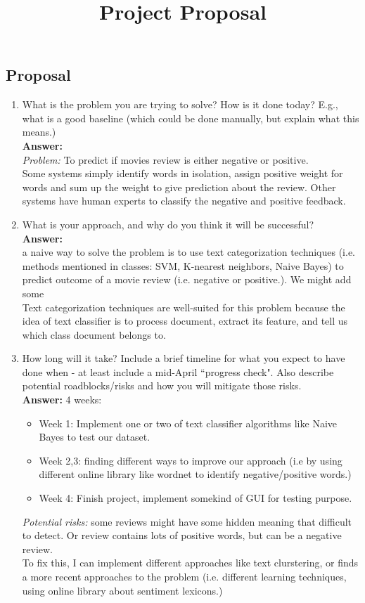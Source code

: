\documentclass[]{article}
\title{Project Proposal}
\begin{document}
\maketitle


\subsection{Proposal}\label{Potential risks:}
\begin{enumerate}
\item 
What is the problem you are trying to solve?
How is it done today? E.g., what is a good baseline (which could be done manually, but explain what this means.)\\
\textbf{Answer:}\\ \textit{Problem:} To predict if movies review is either negative or positive.\\
Some systems simply identify words in isolation, assign positive weight for words and sum up the weight to give prediction about the review. Other systems have human experts to classify the negative and positive feedback. 
\item What is your approach, and why do you think it will be successful?\\
\textbf{Answer:}\\ a naive way to solve the problem is to use text categorization techniques (i.e. methods mentioned in classes: SVM, K-nearest neighbors, Naive Bayes) to predict outcome of a movie review (i.e. negative or positive.). We might add some \\
Text categorization techniques are well-suited for this problem because the idea of text classifier is to process document, extract its feature, and tell us which class document belongs to.
\item How long will it take? Include a brief timeline for what you expect to have done when - at least include a mid-April ``progress check". Also describe potential roadblocks/risks and how you will mitigate those risks.
\\\textbf{Answer:}
4 weeks:
\begin{itemize}
   \item Week 1: Implement one or two of text classifier algorithms like Naive Bayes to test our dataset.
   \item Week 2,3: finding different ways to improve our approach (i.e by using different online library like wordnet to identify negative/positive words.) 
   \item Week 4: Finish project, implement somekind of GUI for testing purpose.
\end{itemize}  
\textit{Potential risks:} some reviews might have some hidden meaning that difficult to detect. Or review contains lots of positive words, but can be a negative review.\\
To fix this, I can implement different approaches like text clurstering, or finds a more recent approaches to the problem (i.e. different learning techniques, using online library about sentiment lexicons.)


\end{enumerate}
\end{document}
